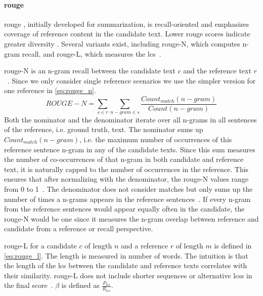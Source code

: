 
\paragraph{\ac{rouge}}
\ac{rouge} \citep{lin_rouge_2004}, initially developed for summarization, is recall-oriented and emphasizes coverage of reference content in the candidate text. 
Lower \ac{rouge} scores indicate greater diversity \citep{kurt_pehlivanoglu_comparative_2024}.
Several variants exist, including \ac{rouge}-N, which computes n-gram recall, and \ac{rouge}-L, which measures the \ac{lcs}~\citep{zhou_paraphrase_2021,palivela_optimization_2021,kurt_pehlivanoglu_comparative_2024}. 

\ac{rouge}-N is an n-gram recall between the candidate text $c$ and the reference text $r$~\citep{lin_rouge_2004}.
Since we only consider single reference scenarios we use the simpler version for one reference in \autoref{eq:rouge_n}.
\begin{equation}
    ROUGE-N = \sum_{s \in r}\sum_{n-gram \in s} \frac{Count_{match}(n-gram)}{Count(n-gram)}
\label{eq:rouge_n}
\end{equation}
Both the nominator and the denominator iterate over all n-grams in all sentences of the reference, i.e. ground truth, text.
The nominator sums up $Count_{match}(n-gram)$, i.e. the maximum number of occurrences of this reference sentence n-gram in any of the candidate texts.
Since this sum measures the number of co-occurrences of that n-gram in both candidate and reference text, it is naturally capped to the number of occurrences in the reference.
This ensures that after normalizing with the denominator, the \ac{rouge}-N values range from 0 to 1~\citep{kurt_pehlivanoglu_comparative_2024}.
The denominator does not consider matches but only sums up the number of times a n-grams appears in the reference sentences~\citep{lin_rouge_2004}.
If every n-gram from the reference sentences would appear equally often in the candidate, the \ac{rouge}-N would be one since it measures the n-gram overlap between reference and candidate from a reference or recall perspective.

\ac{rouge}-L for a candidate $c$ of length $n$ and a reference $r$ of length $m$ is defined in \autoref{eq:rouge_l}.
The length is measured in number of words.
The intuition is that the length of the \ac{lcs} between the candidate and reference texts correlates with their similarity.
\ac{rouge}-L does not include shorter sequences or alternative \acp{lcs} in the final score~\citep{lin_rouge_2004}.
$\beta$ is defined as $\frac{P_{lcs}}{R_{lcs}}$.

